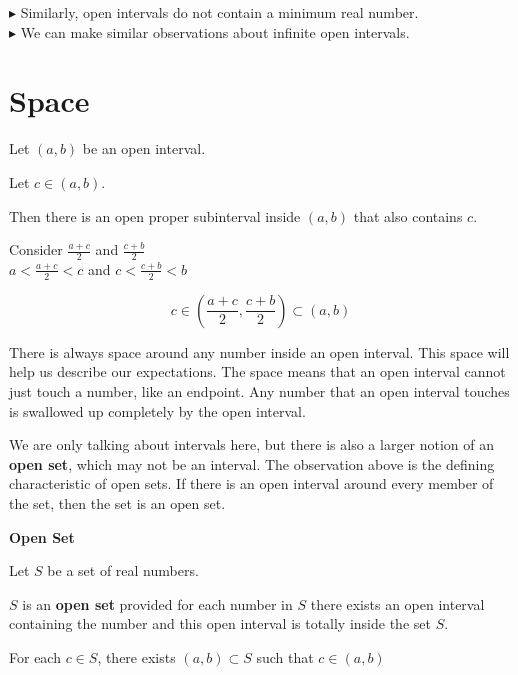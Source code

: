 \documentclass{ximera}
\begin{document}
$\blacktriangleright$ Similarly, open intervals do not contain a minimum real number. \\


$\blacktriangleright$ We can make similar observations about infinite open intervals. \\





\section{Space}

\begin{observation} 


Let $(a,b)$ be an open interval.

Let $c \in (a,b)$.

Then there is an open proper subinterval inside $(a,b)$ that also contains $c$.

\begin{explanation}


Consider $\frac{a+c}{2}$ and  $\frac{c+b}{2}$ \\

$a < \frac{a+c}{2} < c$ and  $c < \frac{c+b}{2}  < b$



\[   c \in \left(\frac{a+c}{2} , \frac{c+b}{2} \right) \subset (a,b)              \]

\end{explanation}
\end{observation}


There is always space around any number inside an open interval.  This space will help us describe our expectations.  The space means that an open interval cannot just touch a number, like an endpoint.  Any number that an open interval touches is swallowed up completely by the open interval.


We are only talking about intervals here, but there is also a larger notion of an \textbf{open set}, which may not be an interval.  The observation above is the defining characteristic of open sets.  If there is an open interval around every member of the set, then the set is an open set.




\begin{definition} \textbf{\textcolor{green!50!black}{Open Set}} 


Let $S$ be a set of real numbers. 

$S$ is an \textbf{open set} provided for each number in $S$ there exists an open interval containing the number and this open interval is totally inside the set $S$.

\begin{center}
For each $c \in S$, there exists $(a,b) \subset S$ such that $c \in (a,b)$
\end{center}

\end{definition}
\end{document}
